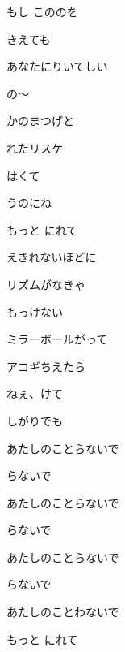 \documentclass[a4paper,tate,twocolumn,12pt]{ltjtarticle}
\begin{document}
\begin{flushleft}
\vspace{2em}

\noindent\begin{minipage}{\linewidth}
もし こののを

きえても

あなたにりいてしい

の〜

かのまつげと

れたリスケ

はくて

うのにね
\end{minipage}

\vspace{2em}

\noindent\begin{minipage}{\linewidth}
もっと にれて

えきれないほどに

リズムがなきゃ

もっけない

ミラーボールがって

アコギちえたら

ねぇ、けて

しがりでも
\end{minipage}

\vspace{2em}

\noindent\begin{minipage}{\linewidth}
あたしのことらないで

らないで

あたしのことらないで

らないで

あたしのことらないで

らないで

あたしのことわないで
\end{minipage}

\vspace{2em}

\noindent\begin{minipage}{\linewidth}
もっと にれて


\end{minipage}
\end{flushleft}
\end{document}
